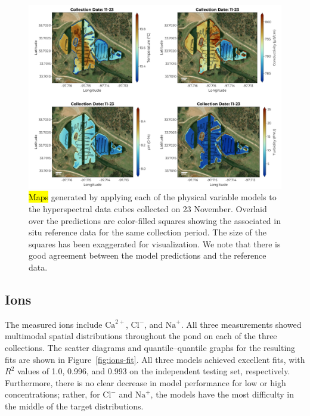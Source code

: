 \documentclass[remotesensing,article,accept,pdftex,moreauthors]{Definitions/mdpi}
\begin{document}
\begin{figure}[H]

\vspace{-0.15in}
\hspace{-6pt}\includegraphics[width=0.9\columnwidth]{figures/results/maps/physical.pdf}
\vspace{-0.05in}
\caption{\hl{Maps} %
 generated by applying each of the physical variable models to the hyperspectral data cubes collected on 23 November. Overlaid over the predictions are color-filled squares showing the associated in situ reference data for the same collection period. The size of the squares has been exaggerated for visualization. We note that there is good agreement between the model predictions and the reference data. \label{fig:map-physical}}
\end{figure}  



\subsection{Ions}

The measured ions include $\mathrm{Ca}^{2+}$, $\mathrm{Cl}^{-}$, and $\mathrm{Na}^{+}$. All three measurements showed multimodal spatial distributions throughout the pond on each of the three collections. The scatter diagrams and quantile--quantile graphs for the resulting fits are shown in Figure~\ref{fig:ions-fit}. All three models achieved excellent fits, with $R^2$ values of 1.0, 0.996, and 0.993 on the independent testing set, respectively. Furthermore, there is no clear decrease in model performance for low or high concentrations; rather, for $\textrm{Cl}^{-}$ and $\textrm{Na}^{+}$, the models have the most difficulty in the middle of the target distributions. 
\end{document}
